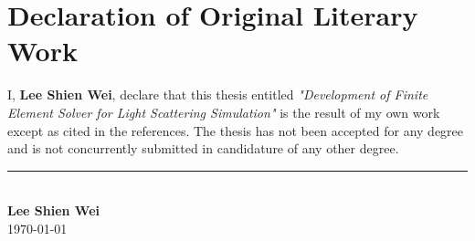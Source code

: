 \chapter*{Declaration of Original Literary Work}

I, \textbf{Lee Shien Wei}, declare that this thesis entitled \textit{"Development of Finite Element Solver for Light Scattering Simulation"} is the result of my own work except as cited in the references. The thesis has not been accepted for any degree and is not concurrently submitted in candidature of any other degree.

\vspace{4cm}

\noindent\rule{5cm}{0.4pt}\\
\textbf{Lee Shien Wei}\\
\today